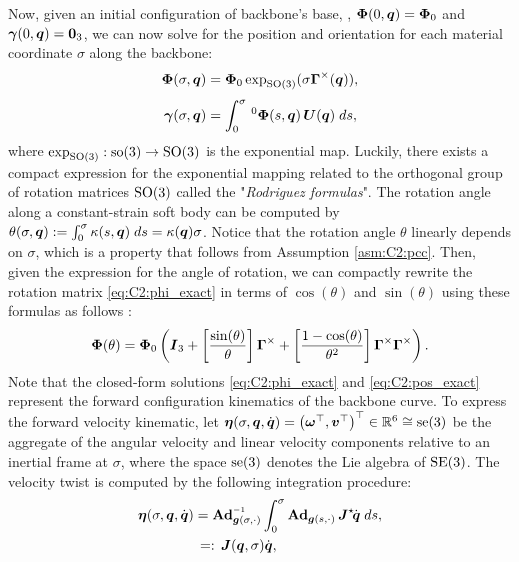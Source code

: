 Now, given an initial configuration of backbone's base, \ie, $\boldsymbol{\Phi}(0,\boldsymbol{q}) = \boldsymbol{\Phi}_0$ and $ {\boldsymbol{\gamma}}(0,{\boldsymbol{q}}) = \boldsymbol{0}_3$, we can now solve for the position and orientation for each material coordinate $\sigma$ along the backbone:
%
\begin{align}
\boldsymbol{\Phi}(\sigma,\boldsymbol{q}) & = \boldsymbol{\Phi}_0\exp_{\textup{\textrm{SO}}(3)}(\sigma \boldsymbol{\Gamma}^\times(\boldsymbol{q})), \label{eq:C2:phi_exact} \\[0.35em]
{\boldsymbol{\gamma}}(\sigma,\boldsymbol{q}) & = \int_0^\sigma\,^0\boldsymbol{\Phi}(s, \boldsymbol{q})\, \boldsymbol{U}(\boldsymbol{q}) \; ds,
\label{eq:C2:pos_exact}
\end{align}
%
where $\exp_{\textup{\textrm{SO}}(3)}: \textup{\textrm{so}}(3) \to \textup{\textrm{SO}}(3)$ is the exponential map. Luckily, there exists a compact expression for the exponential mapping related to the orthogonal group of rotation matrices $\textup{\textrm{SO}}(3)$ called the "\emph{Rodriguez formulas}".  The rotation angle along a constant-strain soft body can be computed by $\theta(\sigma,{\boldsymbol{q}}) := \int_0^\sigma \kappa(s,{\boldsymbol{q}}) \; ds = \kappa({\boldsymbol{q}}) \sigma$. Notice that the rotation angle $\theta$ linearly depends on $\sigma$, which is a property that follows from Assumption \ref{asm:C2:pcc}. Then, given the expression for the angle of rotation,  we can compactly rewrite the rotation matrix \eqref{eq:C2:phi_exact} in terms of $\cos(\theta)$ and $\sin(\theta)$ using these formulas as follows \cite{Lynch2017}:
%
\begin{equation}
{\boldsymbol{\Phi}}(\theta) = {\boldsymbol{\Phi}}_0 \left( \boldsymbol{I}_3 + \left[ \frac{\sin(\theta)}{\theta} \right]  {\boldsymbol{\Gamma}}^{\times} + \left[ \frac{1-\cos(\theta)}{\theta^2} \right]  {\boldsymbol{\Gamma}}^{\times} {\boldsymbol{\Gamma}}^{\times} \right).
\label{eq:C2:phi_rodr}
\end{equation}
%
Note that the closed-form solutions \eqref{eq:C2:phi_exact} and \eqref{eq:C2:pos_exact} represent the forward configuration kinematics of the backbone curve. To express the forward velocity kinematic, let
${\boldsymbol{\eta}}(\sigma,{\boldsymbol{q}},{\dot{\boldsymbol{q}}}) = \left( \boldsymbol{\omega}^\top, \boldsymbol{v}^\top \right)^\top \in \mathbb{R}^6 \cong \textup{\textrm{se}}(3)$
 be the aggregate of the angular velocity and linear velocity components relative to an inertial frame at $\sigma$, where the space $\textup{\textrm{se}}(3)$ denotes the Lie algebra of $\textup{\textrm{SE}}(3)$. The velocity twist is computed by the following integration procedure:
%
\begin{align}
 \etaB(\sigma,\q,\dq)& = \Ad_{\mat{g}(\sigma,\cdot)}\inv \int_0^\sigma \Ad_{\mat{g}(s,\cdot)}\, \JB^\star\! \dq\;ds, \notag \\ & 
 \,=:\, \JB(\q,\sigma) \dq, \label{eq:C2:vel_cont}
\end{align}
